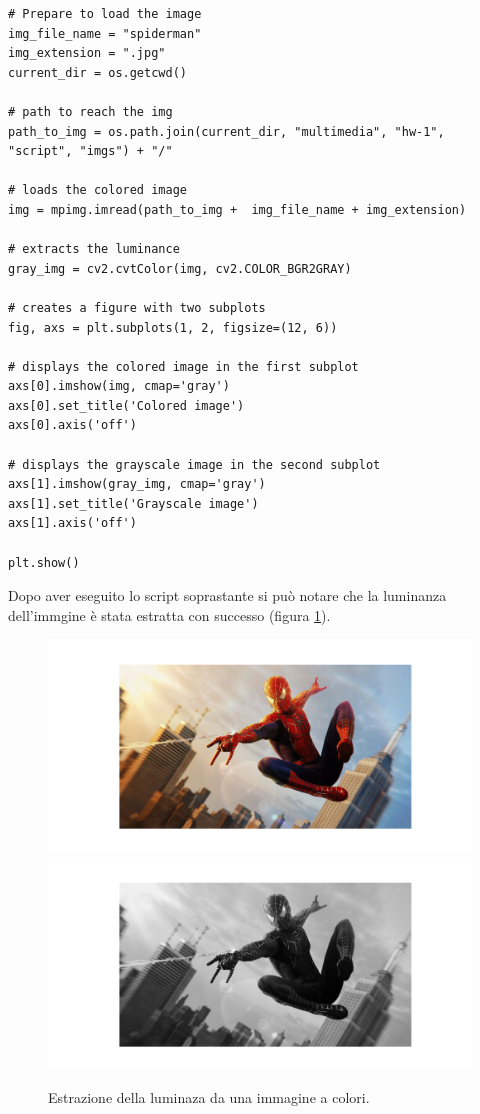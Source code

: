 \begin{lstlisting}
# Prepare to load the image
img_file_name = "spiderman"
img_extension = ".jpg"
current_dir = os.getcwd()

# path to reach the img
path_to_img = os.path.join(current_dir, "multimedia", "hw-1", "script", "imgs") + "/"

# loads the colored image
img = mpimg.imread(path_to_img +  img_file_name + img_extension) 

# extracts the luminance
gray_img = cv2.cvtColor(img, cv2.COLOR_BGR2GRAY)

# creates a figure with two subplots
fig, axs = plt.subplots(1, 2, figsize=(12, 6))

# displays the colored image in the first subplot
axs[0].imshow(img, cmap='gray')
axs[0].set_title('Colored image')
axs[0].axis('off')

# displays the grayscale image in the second subplot
axs[1].imshow(gray_img, cmap='gray')
axs[1].set_title('Grayscale image')
axs[1].axis('off')

plt.show()
\end{lstlisting}

\noindent Dopo aver eseguito lo script soprastante si può notare che la luminanza dell'immgine è stata estratta con successo (figura \ref{fig:luminanza}).

\begin{figure}[h]
    \centering
    \includegraphics[width = .7\textwidth]{hw-1/report/imgs/colored.png}
    \includegraphics[width = .7\textwidth]{hw-1/report/imgs/grayscale.png}
    \caption{Estrazione della luminaza da una immagine a colori.}
    \label{fig:luminanza}
\end{figure}

